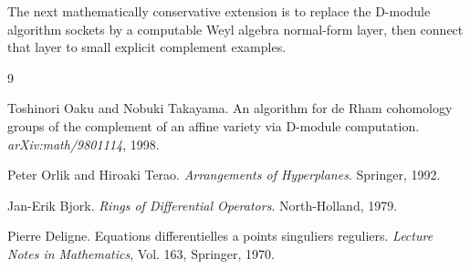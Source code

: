 \documentclass[11pt]{article}
\begin{document}
The next mathematically conservative extension is to replace the D-module
algorithm sockets by a computable Weyl algebra normal-form layer, then connect
that layer to small explicit complement examples.

\begin{thebibliography}{9}

Toshinori Oaku and Nobuki Takayama.
\newblock An algorithm for de Rham cohomology groups of the complement of an affine variety via D-module computation.
\newblock \emph{arXiv:math/9801114}, 1998.

Peter Orlik and Hiroaki Terao.
\newblock \emph{Arrangements of Hyperplanes}.
\newblock Springer, 1992.

Jan-Erik Bjork.
\newblock \emph{Rings of Differential Operators}.
\newblock North-Holland, 1979.

Pierre Deligne.
\newblock Equations differentielles a points singuliers reguliers.
\newblock \emph{Lecture Notes in Mathematics}, Vol. 163, Springer, 1970.

\end{thebibliography}
\end{document}

